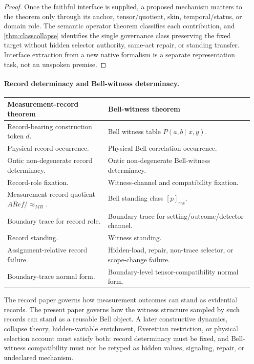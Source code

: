 \documentclass[11pt]{article}
\theoremstyle{definition}
\newcommand{\Bell}{\mathcal{B}}
\begin{document}
\begin{proof}
Once the faithful interface is supplied, a proposed mechanism matters to the theorem only through its anchor, tensor/quotient, skin, temporal/status, or domain role. The semantic operator theorem classifies each contribution, and \cref{thm:classcollapse} identifies the single governance class preserving the fixed target without hidden selector authority, same-act repair, or standing transfer. Interface extraction from a new native formalism is a separate representation task, not an unspoken premise.
\end{proof}

\paragraph{Record determinacy and Bell-witness determinacy.}
\begin{center}
\footnotesize
\begin{tabularx}{0.95\linewidth}{Y Y}
\toprule
\textbf{Measurement-record theorem} & \textbf{Bell-witness theorem}\\
\midrule
Record-bearing construction token $d$. & Bell witness table $P(a,b\mid x,y)$.\\
Physical record occurrence. & Physical Bell correlation occurrence.\\
Ontic non-degenerate record determinacy. & Ontic non-degenerate Bell-witness determinacy.\\
Record-role fixation. & Witness-channel and compatibility fixation.\\
Measurement-record quotient $ARef/\!\approx_{MR}$. & Bell standing class $[p]_{\sim_{\Bell}}$.\\
Boundary trace for record role. & Boundary trace for setting/outcome/detector channel.\\
Record standing. & Witness standing.\\
Assignment-relative record failure. & Hidden-load, repair, non-trace selector, or scope-change failure.\\
Boundary-trace normal form. & Boundary-level tensor-compatibility normal form.\\
\bottomrule
\end{tabularx}
\end{center}

The record paper governs how measurement outcomes can stand as evidential records. The present paper governs how the witness structure sampled by such records can stand as a reusable Bell object. A later constructive dynamics, collapse theory, hidden-variable enrichment, Everettian restriction, or physical selection account must satisfy both: record determinacy must be fixed, and Bell-witness compatibility must not be retyped as hidden values, signaling, repair, or undeclared mechanism.
\end{document}

